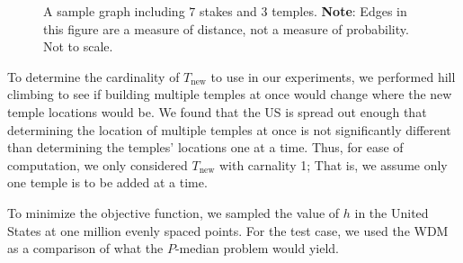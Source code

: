 \documentclass[twoside,twocolumn]{article}
\begin{document}
\begin{figure}[h!]
\centering
{}
\caption{A sample graph including $7$ stakes and $3$ temples. \textbf{Note}: Edges in this figure are a measure of distance, not a measure of probability. Not to scale.} %
\label{fig:M1}
\end{figure}

To determine the cardinality of $T_{\text{new}}$ to use in our experiments, we performed hill climbing to see if building multiple temples at once would change where the new temple locations would be. %
We found that the US is spread out enough that determining the location of multiple temples at once is not significantly different than determining the temples' locations one at a time.
Thus, for ease of computation, we only considered $T_{\text{new}}$ with carnality 1;
That is, we assume only one temple is to be added at a time.

To minimize the objective function, we sampled the value of $h$ in the United States at one million evenly spaced points.
For the test case, we used the WDM as a comparison of what the $P$-median problem would yield.
\end{document}
